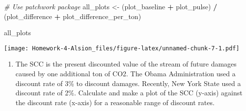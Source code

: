 \documentclass[
]{article}
\newenvironment{Shaded}{\begin{snugshade}}{\end{snugshade}}
\newcommand{\CommentTok}[1]{\textcolor[rgb]{0.56,0.35,0.01}{\textit{#1}}}
\newcommand{\NormalTok}[1]{#1}
\newcommand{\OperatorTok}[1]{\textcolor[rgb]{0.81,0.36,0.00}{\textbf{#1}}}
\newcommand{\StringTok}[1]{\textcolor[rgb]{0.31,0.60,0.02}{#1}}
\providecommand{\tightlist}{%
  \setlength{\itemsep}{0pt}\setlength{\parskip}{0pt}}
\begin{document}
\begin{Shaded}
\begin{Highlighting}[]
\CommentTok{# Use patchwork package}
\NormalTok{all_plots <-}\StringTok{ }\NormalTok{(plot_baseline }\OperatorTok{+}\StringTok{ }\NormalTok{plot_pulse) }\OperatorTok{/}\StringTok{ }\NormalTok{(plot_difference }\OperatorTok{+}\StringTok{ }\NormalTok{plot_difference_per_ton)}

\NormalTok{all_plots}
\end{Highlighting}
\end{Shaded}

\texttt{[image: Homework-4-Alsion\_files/figure-latex/unnamed-chunk-7-1.pdf]}

\begin{enumerate}
\def\labelenumi{\arabic{enumi}.}
\setcounter{enumi}{2}
\tightlist
\item
  The SCC is the present discounted value of the stream of future
  damages caused by one additional ton of CO2. The Obama Administration
  used a discount rate of 3\% to discount damages. Recently, New York
  State used a discount rate of 2\%. Calculate and make a plot of the
  SCC (y-axis) against the discount rate (x-axis) for a reasonable range
  of discount rates.
\end{enumerate}
\end{document}
